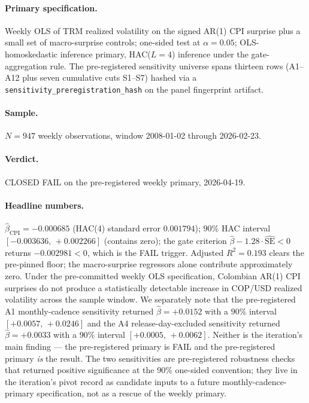 \paragraph{Primary specification.} Weekly OLS of TRM realized
volatility on the signed AR(1) CPI surprise plus a small set of
macro-surprise controls; one-sided test at \(\alpha = 0.05\);
OLS-homoskedastic inference primary, HAC(\(L = 4\)) inference under
the gate-aggregation rule. The pre-registered sensitivity universe
spans thirteen rows (A1--A12 plus seven cumulative cuts S1--S7)
hashed via a \texttt{sensitivity\_preregistration\_hash} on the
panel fingerprint artifact.

\paragraph{Sample.} \(N = 947\) weekly observations, window
2008-01-02 through 2026-02-23.

\paragraph{Verdict.} CLOSED FAIL on the pre-registered weekly primary,
2026-04-19.

\paragraph{Headline numbers.} \(\hat{\beta}_{\mathrm{CPI}} = -0.000685\)
(HAC(4) standard error \(0.001794\)); \(90\%\) HAC interval
\([-0.003636,\,+0.002266]\) (contains zero); the gate criterion
\(\hat{\beta} - 1.28 \cdot \widehat{\mathrm{SE}} < 0\) returns
\(-0.002981 < 0\), which is the FAIL trigger. Adjusted \(R^2 = 0.193\)
clears the pre-pinned floor; the macro-surprise regressors alone
contribute approximately zero. Under the pre-committed weekly OLS
specification, Colombian AR(1) CPI surprises do not produce a
statistically detectable increase in COP/USD realized volatility
across the sample window. We separately note that the pre-registered
A1 monthly-cadence sensitivity returned
\(\hat{\beta} = +0.0152\) with a \(90\%\) interval
\([+0.0057,\,+0.0246]\) and the A4 release-day-excluded sensitivity
returned \(\hat{\beta} = +0.0033\) with a \(90\%\) interval
\([+0.0005,\,+0.0062]\). Neither is the iteration's main finding ---
the pre-registered primary is FAIL and the pre-registered primary
\emph{is} the result. The two sensitivities are pre-registered
robustness checks that returned positive significance at the
\(90\%\) one-sided convention; they live in the iteration's
pivot record as candidate inputs to a future
monthly-cadence-primary specification, not as a rescue of the
weekly primary.

